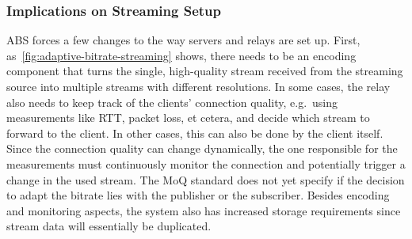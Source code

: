 \subsubsection{Implications on Streaming Setup}
ABS forces a few changes to the way servers and relays are set up.
First, as~\autoref{fig:adaptive-bitrate-streaming} shows, there needs to 
be an encoding component that turns the single, high-quality stream  
received from the streaming source into multiple streams with different resolutions.
In some cases, the relay also needs to keep track of the clients' connection quality, e.g.~using 
measurements like RTT, packet loss, et cetera, and decide which stream to forward to the client.
In other cases, this can also be done by the client itself.
Since the connection quality can change dynamically, the one responsible for
the measurements must continuously monitor the connection and potentially trigger a change in 
the used stream.
The MoQ standard does not yet specify if the decision to adapt the bitrate lies with the
publisher or the subscriber.
Besides encoding and monitoring aspects, the system also has increased storage requirements
since stream data will essentially be duplicated.
